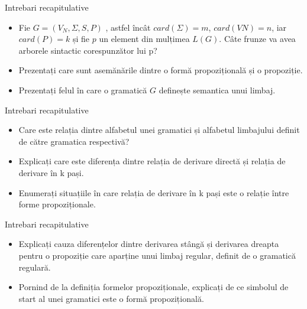\documentclass[pdf]{beamer}
\begin{document}
\begin{frame}{Intrebari recapitulative}
\begin{itemize}
\item
Fie $G = (V_{N}, \Sigma, S, P )$ , astfel încât $card(\Sigma)=m$,  $card(VN)=n$, iar $card(P)=k$ și fie $p$ un element din mulțimea $L(G)$. Câte frunze va avea arborele sintactic corespunzător lui p?
\newline 

\item
Prezentați care sunt asemănările dintre o formă propozițională și o propoziție.
\newline

\item
Prezentați felul în care o gramatică $G$ definește semantica unui limbaj.
\newline

\end{itemize}
\end{frame}



\begin{frame}{Intrebari recapitulative}
\begin{itemize}

\item
Care este relația dintre alfabetul unei gramatici și alfabetul limbajului definit de către gramatica respectivă?
\newline

\item
Explicați care este diferența dintre relația de derivare directă și relația de derivare în k pași.
\newline

\item
Enumerați situațiile în care relația de derivare în k pași este o relație între forme propoziționale.

\end{itemize}
\end{frame}



\begin{frame}{Intrebari recapitulative}
\begin{itemize}

\item
Explicați cauza diferențelor dintre derivarea stângă și derivarea dreapta pentru o propoziție care aparține unui limbaj regular, definit de o gramatică regulară.
\newline

\item
Pornind de la definiția formelor propoziționale, explicați de ce simbolul de start al unei gramatici este o formă propozițională.

\end{itemize}
\end{frame}
\end{document}
